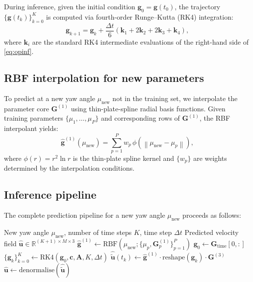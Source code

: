 \documentclass[12pt]{article}
\newcommand{\R}{\mathbb{R}}
\newcommand{\norm}[1]{\left\| #1 \right\|}
\newcommand{\mat}[1]{\mathbf{#1}}
\newcommand{\vect}[1]{\mathbf{#1}}
\newcommand{\dt}{\Delta t}
\begin{document}
During inference, given the initial condition $\vect{g}_0 = \vect{g}(t_0)$, the trajectory $\{\vect{g}(t_k)\}_{k=0}^{K}$ is computed via fourth-order Runge--Kutta (RK4) integration:
\begin{equation}
    \vect{g}_{k+1} = \vect{g}_k + \frac{\dt}{6}\left(\vect{k}_1 + 2\vect{k}_2 + 2\vect{k}_3 + \vect{k}_4\right),
\end{equation}
where $\vect{k}_i$ are the standard RK4 intermediate evaluations of the right-hand side of \cref{eq:opinf}.

\subsection{RBF interpolation for new parameters}
\label{sec:rbf}

To predict at a new yaw angle $\mu_{\text{new}}$ not in the training set, we interpolate the parameter core $\mat{G}^{(1)}$ using thin-plate-spline radial basis functions.
Given training parameters $\{\mu_1, \dots, \mu_P\}$ and corresponding rows of $\mat{G}^{(1)}$, the RBF interpolant yields:
\begin{equation}
    \hat{\vect{g}}^{(1)}(\mu_{\text{new}}) = \sum_{p=1}^{P} w_p \, \phi\!\left(\norm{\mu_{\text{new}} - \mu_p}\right),
\end{equation}
where $\phi(r) = r^2 \ln r$ is the thin-plate spline kernel and $\{w_p\}$ are weights determined by the interpolation conditions.

\subsection{Inference pipeline}
\label{sec:pipeline}

The complete prediction pipeline for a new yaw angle $\mu_{\text{new}}$ proceeds as follows:

\begin{algorithm}[H]
\caption{TT-OpInf Inference}
\label{alg:inference}
\begin{algorithmic}[1]
\Require New yaw angle $\mu_{\text{new}}$, number of time steps $K$, time step $\dt$
\Ensure Predicted velocity field $\hat{\vect{u}} \in \R^{(K+1) \times M \times 3}$
\State $\hat{\vect{g}}^{(1)} \gets \text{RBF}(\mu_{\text{new}}; \{\mu_p, \mat{G}^{(1)}_p\}_{p=1}^{P})$
\State $\vect{g}_0 \gets \mat{G}_{\text{time}}[0, :]$
\State $\{\vect{g}_k\}_{k=0}^{K} \gets \text{RK4}(\vect{g}_0, \vect{c}, \mat{A}, K, \dt)$
    \State $\hat{\tilde{\vect{u}}}(t_k) \gets \hat{\vect{g}}^{(1)} \cdot \text{reshape}(\vect{g}_k) \cdot \mat{G}^{(3)}$
\EndFor
\State $\hat{\vect{u}} \gets \text{denormalise}(\hat{\tilde{\vect{u}}})$
\end{algorithmic}
\end{algorithm}
\end{document}
